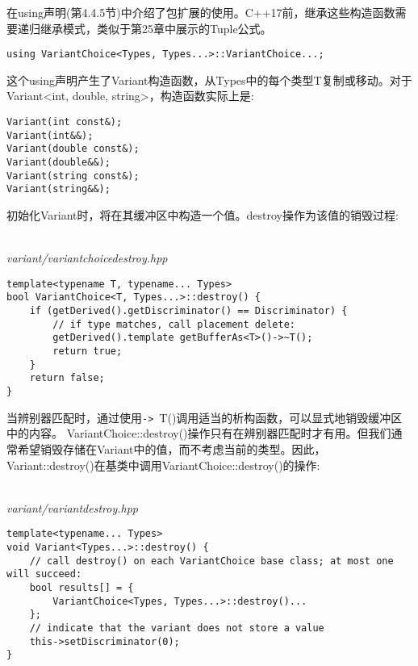 \begin{tcolorbox}[colback=webgreen!5!white,colframe=webgreen!75!black]
\hspace*{0.75cm}在using声明(第4.4.5节)中介绍了包扩展的使用。C++17前，继承这些构造函数需要递归继承模式，类似于第25章中展示的Tuple公式。
\end{tcolorbox}

\begin{lstlisting}[style=styleCXX]
using VariantChoice<Types, Types...>::VariantChoice...;
\end{lstlisting}

这个using声明产生了Variant构造函数，从Types中的每个类型T复制或移动。对于Variant<int, double, string>，构造函数实际上是:

\begin{lstlisting}[style=styleCXX]
Variant(int const&);
Variant(int&&);
Variant(double const&);
Variant(double&&);
Variant(string const&);
Variant(string&&);
\end{lstlisting}


初始化Variant时，将在其缓冲区中构造一个值。destroy操作为该值的销毁过程:

\hspace*{\fill} \\ %
\noindent
\textit{variant/variantchoicedestroy.hpp}
\begin{lstlisting}[style=styleCXX]
template<typename T, typename... Types>
bool VariantChoice<T, Types...>::destroy() {
	if (getDerived().getDiscriminator() == Discriminator) {
		// if type matches, call placement delete:
		getDerived().template getBufferAs<T>()->~T();
		return true;
	}
	return false;
}
\end{lstlisting}

当辨别器匹配时，通过使用\texttt{->}~T()调用适当的析构函数，可以显式地销毁缓冲区中的内容。 
VariantChoice::destroy()操作只有在辨别器匹配时才有用。但我们通常希望销毁存储在Variant中的值，而不考虑当前的类型。因此，Variant::destroy()在基类中调用VariantChoice::destroy()的操作:

\hspace*{\fill} \\ %
\noindent
\textit{variant/variantdestroy.hpp}
\begin{lstlisting}[style=styleCXX]
template<typename... Types>
void Variant<Types...>::destroy() {
	// call destroy() on each VariantChoice base class; at most one will succeed:
	bool results[] = {
		VariantChoice<Types, Types...>::destroy()...
	};
	// indicate that the variant does not store a value
	this->setDiscriminator(0);
}
\end{lstlisting}

